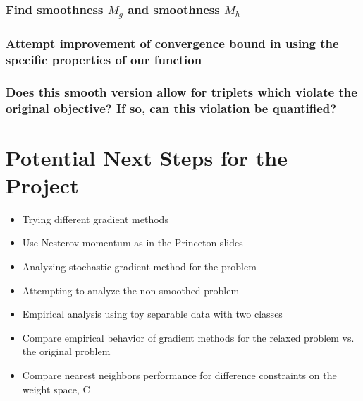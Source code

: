 \documentclass[11pt]{article}
\begin{document}
\subsubsection{Find smoothness $M_g$ and smoothness $M_h$}

\subsubsection{Attempt improvement of convergence bound in \cite{khamaru_convergence_nodate} using the specific properties of our function}

\subsubsection{Does this smooth version allow for triplets which violate the original objective? If so, can this violation be quantified?}

\section{Potential Next Steps for the Project}

\begin{itemize}
  \item Trying different gradient methods
  \item Use Nesterov momentum as in the Princeton slides
  \item Analyzing stochastic gradient method for the problem
  \item Attempting to analyze the non-smoothed problem
  \item Empirical analysis using toy separable data with two classes
  \item Compare empirical behavior of gradient methods for the relaxed problem vs. the original problem
  \item Compare nearest neighbors performance for difference constraints on the weight space, C
\end{itemize}


\end{document}
